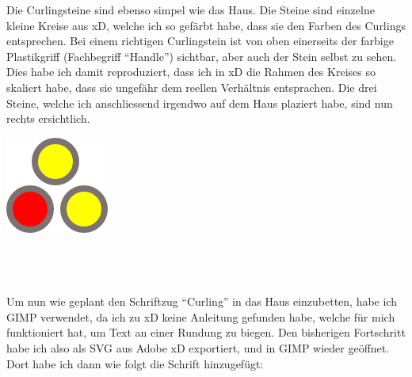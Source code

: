 \documentclass[11pt]{article}
\begin{document}
    \noindent\begin{minipage}{0.6\textwidth}
                 Die Curlingsteine sind ebenso simpel wie das Haus. Die Steine sind einzelne kleine Kreise aus xD, welche
                 ich so gefärbt habe, dass sie den Farben des Curlings entsprechen. Bei einem richtigen Curlingstein ist
                 von oben einerseits der farbige Plastikgriff (Fachbegriff ``Handle'') sichtbar, aber auch der Stein
                 selbst zu sehen. Dies habe ich damit reproduziert, dass ich in xD die Rahmen des Kreises so skaliert
                 habe, dass sie ungefähr dem reellen Verhältnis entsprachen. Die drei Steine, welche ich anschliessend
                 irgendwo auf dem Haus plaziert habe, sind nun rechts ersichtlich.
    \end{minipage}
    \hfill
    \begin{minipage}[c]{0.3\textwidth}
        \raggedleft
        \includegraphics[width=\linewidth]{media/curling_stones}
    \end{minipage}
    \\\\\\Um nun wie geplant den Schriftzug ``Curling'' in das Haus einzubetten, habe ich GIMP verwendet, da ich zu xD keine
    Anleitung gefunden habe, welche für mich funktioniert hat, um Text an einer Rundung zu biegen. Den bisherigen
    Fortschritt habe ich also als SVG aus Adobe xD exportiert, und in GIMP wieder geöffnet.
    Dort habe ich dann wie folgt die Schrift hinzugefügt:
\end{document}
